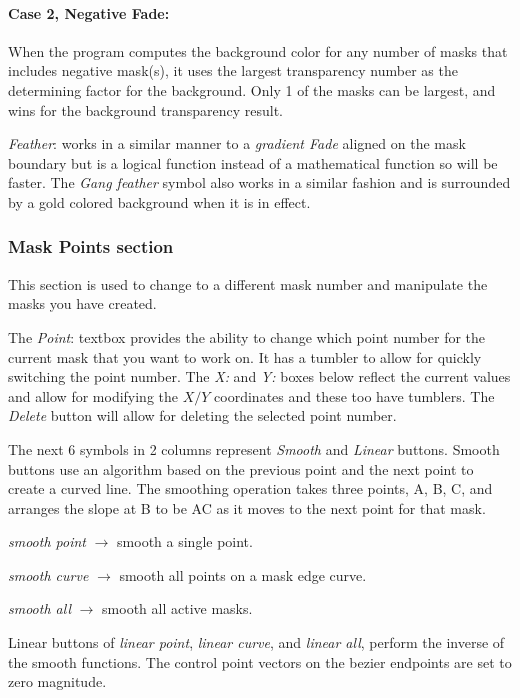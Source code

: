 \paragraph{Case 2, Negative Fade:} When the program computes the background color for any number of masks that includes negative
mask(s), it uses the largest transparency number as the determining factor for the background. Only 1 of the masks can be largest, and wins for the background transparency result.

\vspace{3ex}\textit{Feather}: works in a similar manner to a \textit{gradient Fade} aligned on the mask boundary but is a logical function instead of a mathematical function so will be faster.  The \textit{Gang feather} symbol also works in a similar fashion and is surrounded by a gold colored background when it is in effect.

\subsubsection*{Mask Points section}%
\label{ssub:masks_points_section}

This section is used to change to a different mask number and manipulate the masks you have created.

The \textit{Point}: textbox provides the ability to change which point number for the current mask that you want to work on.  It has a tumbler to allow for quickly switching the point number.  The \textit{X:} and \textit{Y:} boxes below reflect the current values and allow for modifying the $X/Y$ coordinates and these too have tumblers. The \textit{Delete} button will allow for deleting the selected point number.

The next 6 symbols in 2 columns represent \textit{Smooth} and \textit{Linear} buttons.  Smooth buttons use an algorithm based on the previous point and the next point to create a curved line. The smoothing operation takes three points, A, B, C, and arranges the slope at B to be AC as it moves to the next point for that mask.

\textit{smooth point}	$\rightarrow$ smooth a single point.

\textit{smooth curve}	$\rightarrow$ smooth all points on a mask edge curve.

\textit{smooth all} 	$\rightarrow$ smooth all active masks.

Linear buttons of \textit{linear point}, \textit{linear curve}, and \textit{linear all}, perform the inverse of the smooth functions.
The control point vectors on the bezier endpoints are set to zero magnitude.

